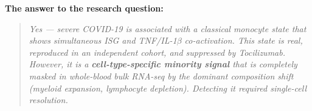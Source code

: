 \documentclass[11pt, a4paper]{article}
\begin{document}
\bigskip
\noindent\textbf{The answer to the research question:}

\begin{quote}
\textit{Yes — severe COVID-19 is associated with a classical monocyte state that
shows simultaneous ISG and TNF/IL-1$\beta$ co-activation. This state is real,
reproduced in an independent cohort, and suppressed by Tocilizumab. However,
it is a \textbf{cell-type-specific minority signal} that is completely masked
in whole-blood bulk RNA-seq by the dominant composition shift (myeloid expansion,
lymphocyte depletion). Detecting it required single-cell resolution.}
\end{quote}
\end{document}
